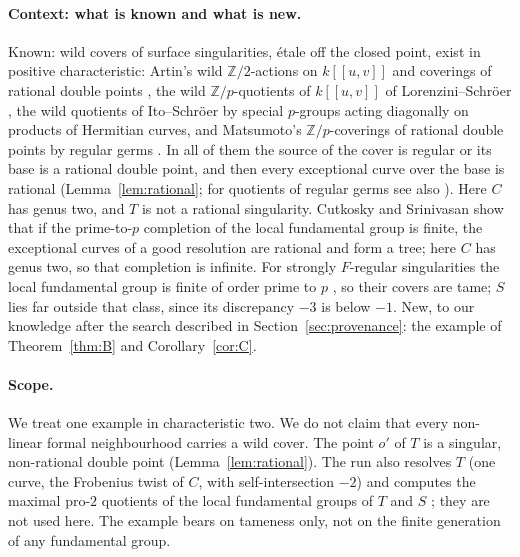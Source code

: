 \documentclass[11pt,a4paper]{article}
\theoremstyle{definition}
\newcommand{\Z}{\mathbb{Z}}
\begin{document}
\paragraph{Context: what is known and what is new.} Known: wild covers of
surface singularities, \'etale off the closed point, exist in positive
characteristic: Artin's wild $\Z/2$-actions on $k[[u,v]]$ \cite{Ar75} and
coverings of rational double points \cite{Ar77}, the wild $\Z/p$-quotients
of $k[[u,v]]$ of Lorenzini--Schr\"oer \cite{LS20,LS23}, the wild quotients
of Ito--Schr\"oer \cite{IS} by special $p$-groups acting diagonally on
products of Hermitian curves, and Matsumoto's $\Z/p$-coverings of rational
double points by regular germs \cite[\S6.2 and Lemma~6.6]{Ma}. In all of them
the source of the cover is regular or its base is a rational double point,
and then every exceptional curve over the base is rational
(Lemma~\ref{lem:rational}; for quotients of regular germs see also
\cite[p.~5]{IS}). Here $C$ has genus two, and $T$ is not a rational
singularity. Cutkosky and Srinivasan \cite[Thm.~1(b)]{CS} show that if the
prime-to-$p$ completion of the local fundamental group is finite, the
exceptional curves of a good resolution are rational and form a tree; here
$C$ has genus two, so that completion is infinite. For strongly $F$-regular
singularities the local fundamental group is finite of order prime to $p$
\cite[Thm.~A]{CST}, so their covers are tame; $S$ lies far outside that
class, since its discrepancy $-3$ is below $-1$. New, to our knowledge after
the search described in Section~\ref{sec:provenance}: the example of
Theorem~\ref{thm:B} and Corollary~\ref{cor:C}.

\paragraph{Scope.} We treat one example in characteristic two. We do not
claim that every non-linear formal neighbourhood carries a wild cover. The
point $o'$ of $T$ is a singular, non-rational double point
(Lemma~\ref{lem:rational}). The run also resolves $T$ (one curve, the
Frobenius twist of $C$, with self-intersection $-2$) and computes the maximal pro-$2$ quotients of the
local fundamental groups of $T$ and $S$ \cite[Prop.~4.61, Cor.~4.62]{SA12};
they are not used here. The example bears on tameness only, not on the
finite generation of any fundamental group.
\end{document}
